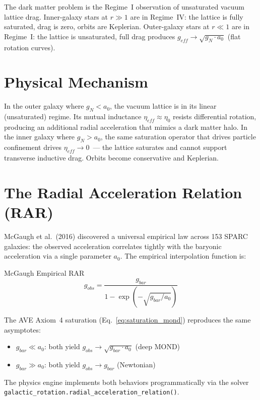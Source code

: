 \noindent The dark matter problem is the Regime~I observation of unsaturated vacuum lattice drag.  Inner-galaxy stars at $r \gg 1$ are in Regime~IV: the lattice is fully saturated, drag is zero, orbits are Keplerian.  Outer-galaxy stars at $r \ll 1$ are in Regime~I: the lattice is unsaturated, full drag produces $g_{eff} \to \sqrt{g_N \cdot a_0}$ (flat rotation curves).

\section{Physical Mechanism}

In the outer galaxy where $g_N < a_0$,
the vacuum lattice is in its linear (unsaturated) regime.  Its mutual
inductance $\eta_{eff} \approx \eta_0$ resists differential rotation,
producing an additional radial acceleration that mimics a dark matter
halo.  In the inner galaxy where $g_N > a_0$, the same saturation
operator that drives particle confinement drives
$\eta_{eff} \to 0$~--- the lattice saturates and cannot support
transverse inductive drag.  Orbits become conservative and Keplerian.

\section{The Radial Acceleration Relation (RAR)}
\label{sec:rar}

McGaugh et al.\ (2016) discovered a universal empirical law across 153 SPARC galaxies: the observed acceleration correlates tightly with the baryonic acceleration via a single parameter $a_0$.  The empirical interpolation function is:
\begin{resultbox}{McGaugh Empirical RAR}
\begin{equation}
    g_{obs} = \frac{g_{bar}}{1 - \exp\!\left(-\sqrt{g_{bar}/a_0}\right)}
    \label{eq:rar_mcgaugh}
\end{equation}
\end{resultbox}
The AVE Axiom~4 saturation (Eq.~\ref{eq:saturation_mond}) reproduces the same asymptotes:
\begin{itemize}
    \item $g_{bar} \ll a_0$: both yield $g_{obs} \to \sqrt{g_{bar} \cdot a_0}$ (deep MOND)
    \item $g_{bar} \gg a_0$: both yield $g_{obs} \to g_{bar}$ (Newtonian)
\end{itemize}
The physics engine implements both behaviors programmatically via the solver 
\texttt{galactic\_}\allowbreak\texttt{rotation.}\allowbreak\texttt{radial\_}\allowbreak\texttt{acceleration\_}\allowbreak\texttt{relation()}.

